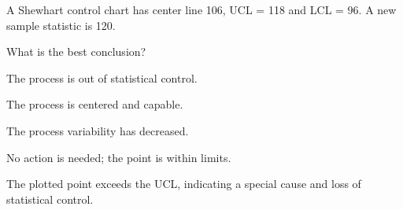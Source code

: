 
\begin{question}
A Shewhart control chart has center line 106, UCL = 118 and LCL = 96. A new sample statistic is 120.

What is the best conclusion?
\begin{answerlist}
  \item The process is out of statistical control.
  \item The process is centered and capable.
  \item The process variability has decreased.
  \item No action is needed; the point is within limits.
\end{answerlist}
\end{question}

\begin{solution}
The plotted point exceeds the UCL, indicating a special cause and loss of statistical control.
\end{solution}

